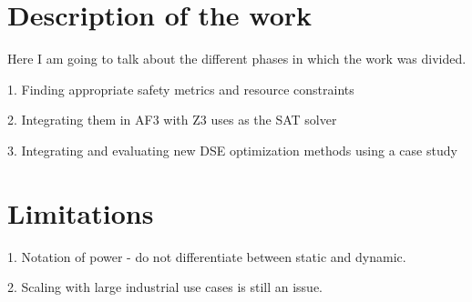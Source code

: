\section{Description of the work}

Here I am going to talk about the different phases in which the work was divided. 

1. Finding appropriate safety metrics and resource constraints

2. Integrating them in AF3 with Z3 uses as the SAT solver

3. Integrating and evaluating new DSE optimization methods using a case study 

\section{Limitations}

1. Notation of power - do not differentiate between static and dynamic.

2. Scaling with large industrial use cases is still an issue.

